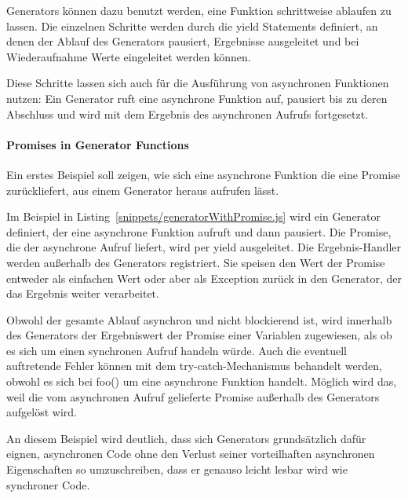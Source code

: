 \documentclass[
11pt, %
a4paper, %
oneside, %
pdfspacing, %
headinclude,
BCOR5mm, %
ngerman, %
bibtotocnumbered,
]{scrartcl}
\begin{document}
		Generators können dazu benutzt werden, eine Funktion schrittweise ablaufen zu lassen. Die einzelnen Schritte werden durch die \textsf{yield} Statements definiert, an denen der Ablauf des Generators pausiert, Ergebnisse ausgeleitet und bei Wiederaufnahme Werte eingeleitet werden können. 
		
		Diese Schritte lassen sich auch für die Ausführung von asynchronen Funktionen nutzen: Ein Generator ruft eine asynchrone Funktion auf, pausiert bis zu deren Abschluss und wird mit dem Ergebnis des asynchronen Aufrufs fortgesetzt.
		
		\paragraph{Promises in Generator Functions}
		Ein erstes Beispiel soll zeigen, wie sich eine asynchrone Funktion die eine Promise zurückliefert, aus einem Generator heraus aufrufen lässt.
		
		
		Im Beispiel in Listing~\ref{snippets/generatorWithPromise.js} wird ein Generator definiert, der eine asynchrone Funktion aufruft und dann pausiert. Die Promise, die der asynchrone Aufruf liefert, wird per \textsf{yield} ausgeleitet. Die Ergebnis-Handler werden außerhalb des Generators registriert. Sie speisen den Wert der Promise entweder als einfachen Wert oder aber als Exception zurück in den Generator, der das Ergebnis weiter verarbeitet.
		
		Obwohl der gesamte Ablauf asynchron und nicht blockierend ist, wird innerhalb des Generators der Ergebniswert der Promise einer Variablen zugewiesen, als ob es sich um einen synchronen Aufruf handeln würde. Auch die eventuell auftretende Fehler können mit dem \textsf{try-catch}-Mechanismus behandelt werden, obwohl es sich bei \textsf{foo()} um eine asynchrone Funktion handelt. Möglich wird das, weil die vom asynchronen Aufruf gelieferte Promise außerhalb des Generators aufgelöst wird.
		
		An diesem Beispiel wird deutlich, dass sich Generators  grundsätzlich dafür eignen, asynchronen Code ohne den Verlust seiner vorteilhaften asynchronen Eigenschaften so umzuschreiben, dass er genauso leicht lesbar wird wie synchroner Code. 
		
\end{document}

